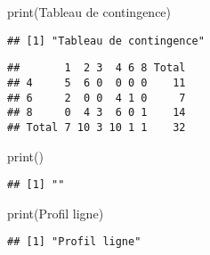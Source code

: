 \documentclass[
]{article}
\newenvironment{Shaded}{\begin{snugshade}}{\end{snugshade}}
\newcommand{\FunctionTok}[1]{\textcolor[rgb]{0.00,0.00,0.00}{#1}}
\newcommand{\NormalTok}[1]{#1}
\newcommand{\SpecialCharTok}[1]{\textcolor[rgb]{0.00,0.00,0.00}{#1}}
\newcommand{\StringTok}[1]{\textcolor[rgb]{0.31,0.60,0.02}{#1}}
\begin{document}
\begin{Shaded}
\begin{Highlighting}[]
\FunctionTok{print}\NormalTok{(}\StringTok{\textquotesingle{}Tableau de contingence\textquotesingle{}}\NormalTok{)}
\end{Highlighting}
\end{Shaded}

\begin{verbatim}
## [1] "Tableau de contingence"
\end{verbatim}

\begin{Shaded}
\end{Shaded}

\begin{verbatim}
##       1  2 3  4 6 8 Total
## 4     5  6 0  0 0 0    11
## 6     2  0 0  4 1 0     7
## 8     0  4 3  6 0 1    14
## Total 7 10 3 10 1 1    32
\end{verbatim}

\begin{Shaded}
\begin{Highlighting}[]
\FunctionTok{print}\NormalTok{(}\StringTok{\textquotesingle{}\textquotesingle{}}\NormalTok{)}
\end{Highlighting}
\end{Shaded}

\begin{verbatim}
## [1] ""
\end{verbatim}

\begin{Shaded}
\begin{Highlighting}[]
\FunctionTok{print}\NormalTok{(}\StringTok{\textquotesingle{}Profil ligne\textquotesingle{}}\NormalTok{)}
\end{Highlighting}
\end{Shaded}

\begin{verbatim}
## [1] "Profil ligne"
\end{verbatim}

\begin{Shaded}
\end{Shaded}
\end{document}
